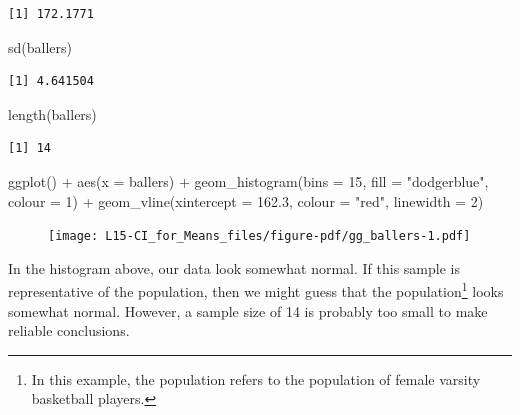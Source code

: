 \documentclass[
  letterpaper,
  DIV=11,
  numbers=noendperiod,
  oneside]{scrreprt}
\newenvironment{Shaded}{\begin{snugshade}}{\end{snugshade}}
\newcommand{\AttributeTok}[1]{\textcolor[rgb]{0.40,0.45,0.13}{#1}}
\newcommand{\DecValTok}[1]{\textcolor[rgb]{0.68,0.00,0.00}{#1}}
\newcommand{\FloatTok}[1]{\textcolor[rgb]{0.68,0.00,0.00}{#1}}
\newcommand{\FunctionTok}[1]{\textcolor[rgb]{0.28,0.35,0.67}{#1}}
\newcommand{\NormalTok}[1]{\textcolor[rgb]{0.00,0.23,0.31}{#1}}
\newcommand{\SpecialCharTok}[1]{\textcolor[rgb]{0.37,0.37,0.37}{#1}}
\newcommand{\StringTok}[1]{\textcolor[rgb]{0.13,0.47,0.30}{#1}}
\begin{document}
\begin{verbatim}
[1] 172.1771
\end{verbatim}

\begin{Shaded}
\begin{Highlighting}[]
\FunctionTok{sd}\NormalTok{(ballers)}
\end{Highlighting}
\end{Shaded}

\begin{verbatim}
[1] 4.641504
\end{verbatim}

\begin{Shaded}
\begin{Highlighting}[]
\FunctionTok{length}\NormalTok{(ballers)}
\end{Highlighting}
\end{Shaded}

\begin{verbatim}
[1] 14
\end{verbatim}

\begin{Shaded}
\begin{Highlighting}[]
\FunctionTok{ggplot}\NormalTok{() }\SpecialCharTok{+}
    \FunctionTok{aes}\NormalTok{(}\AttributeTok{x =}\NormalTok{ ballers) }\SpecialCharTok{+}
    \FunctionTok{geom\_histogram}\NormalTok{(}\AttributeTok{bins =} \DecValTok{15}\NormalTok{, }\AttributeTok{fill =} \StringTok{"dodgerblue"}\NormalTok{, }\AttributeTok{colour =} \DecValTok{1}\NormalTok{) }\SpecialCharTok{+}
    \FunctionTok{geom\_vline}\NormalTok{(}\AttributeTok{xintercept =} \FloatTok{162.3}\NormalTok{, }\AttributeTok{colour =} \StringTok{"red"}\NormalTok{, }\AttributeTok{linewidth =} \DecValTok{2}\NormalTok{)}
\end{Highlighting}
\end{Shaded}

\begin{figure}[H]

{\centering \texttt{[image: L15-CI\_for\_Means\_files/figure-pdf/gg\_ballers-1.pdf]}

}

\end{figure}

In the histogram above, our data look somewhat normal. If this sample is
representative of the population, then we might guess that the
population\footnote{In this example, the population refers to the
  population of female varsity basketball players.} looks somewhat
normal. However, a sample size of 14 is probably too small to make
reliable conclusions.
\end{document}

